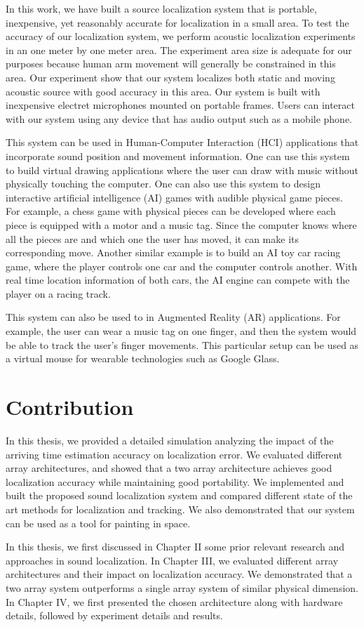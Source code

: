 In this work, we have built a source localization system that is portable, inexpensive, yet reasonably accurate for localization in a small area. To test the accuracy of our localization system, we perform acoustic localization experiments in an one meter by one meter area. The experiment area size is adequate for our purposes because human arm movement will generally be constrained in this area. Our experiment show that our system localizes both static and moving acoustic source with good accuracy in this area. Our system is built with inexpensive electret microphones mounted on portable frames. Users can interact with our system using any device that has audio output such as a mobile phone.

This system can be used in Human-Computer Interaction (HCI) applications that incorporate sound position and movement information. One can use this system to build virtual drawing applications where the user can draw with music without physically touching the computer. One can also use this system to design interactive artificial intelligence (AI) games with audible physical game pieces. For example, a chess game with physical pieces can be developed where each piece is equipped with a motor and a music tag. Since the computer knows where all the pieces are and which one the user has moved, it can make its corresponding move. Another similar example is to build an AI toy car racing game, where the player controls one car and the computer controls another. With real time location information of both cars, the AI engine can compete with the player on a racing track. 

This system can also be used to in Augmented Reality (AR) applications. For example, the user can wear a music tag on one finger, and then the system would be able to track the user's finger movements. This particular setup can be used as a virtual mouse for wearable technologies such as Google Glass. 


\section{Contribution}
In this thesis, we provided a detailed simulation analyzing the impact of the arriving time estimation accuracy on localization error. We evaluated different array architectures, and showed that a two array architecture achieves good localization accuracy while maintaining good portability. We implemented and built the proposed sound localization system and compared different state of the art methods for localization and tracking. We also demonstrated that our system can be used as a tool for painting in space.

In this thesis, we first discussed in Chapter II some prior relevant research and approaches in sound localization. In Chapter III, we evaluated different array architectures and their impact on localization accuracy. We demonstrated that a two array system outperforms a single array system of similar physical dimension. In Chapter IV, we first presented the chosen architecture along with hardware details, followed by experiment details and results. 

